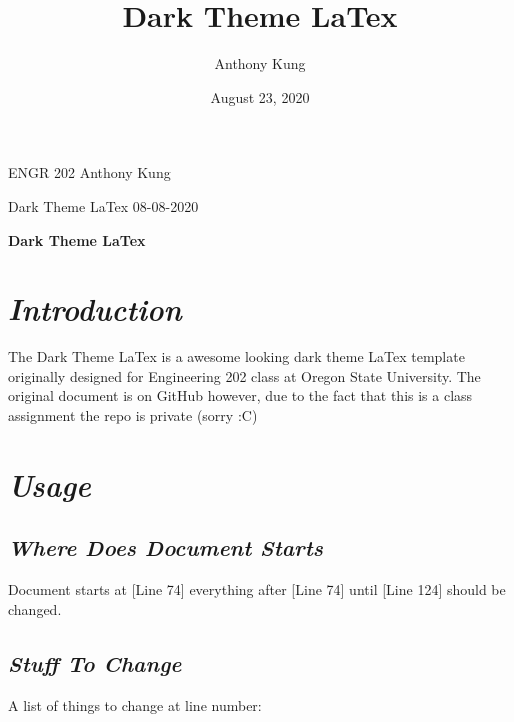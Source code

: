 \documentclass{article}
\title{Dark Theme LaTex}
\author{
  Anthony Kung
}
\date{August 23, 2020}
\begin{document}
\selectfont

ENGR 202
\hfill
Anthony Kung

Dark Theme LaTex
\hfill
08-08-2020

\begin{center}
  \large\textbf{Dark Theme LaTex}
  \\
\end{center}

\tableofcontents

\setlength{\parskip}{1em}

\section{\textbf{\textit{Introduction}}}

The Dark Theme LaTex is a awesome looking dark theme LaTex template originally designed for Engineering 202 class at Oregon State University. The original document is on GitHub however, due to the fact that this is a class assignment the repo is private (sorry :C)

\section{\textbf{\textit{Usage}}}

\subsection{\textbf{\textit{Where Does Document Starts}}}

Document starts at [Line 74] everything after [Line 74] until [Line 124] should be changed.

\subsection{\textbf{\textit{Stuff To Change}}}

A list of things to change at line number:
\end{document}
